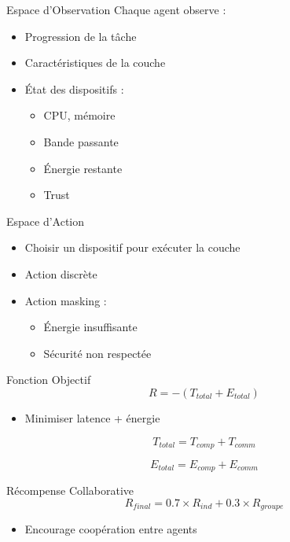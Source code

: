 \documentclass{beamer}
\begin{document}
\begin{frame}{Espace d’Observation}
Chaque agent observe :
\begin{itemize}
    \item Progression de la tâche
    \item Caractéristiques de la couche
    \item État des dispositifs :
    \begin{itemize}
        \item CPU, mémoire
        \item Bande passante
        \item Énergie restante
        \item Trust
    \end{itemize}
\end{itemize}
\end{frame}

\begin{frame}{Espace d’Action}
\begin{itemize}
    \item Choisir un dispositif pour exécuter la couche
    \item Action discrète
    \item Action masking :
    \begin{itemize}
        \item Énergie insuffisante
        \item Sécurité non respectée
    \end{itemize}
\end{itemize}
\end{frame}

\begin{frame}{Fonction Objectif}
\[
R = -(T_{total} + E_{total})
\]

\begin{itemize}
    \item Minimiser latence + énergie
\end{itemize}

\[
T_{total} = T_{comp} + T_{comm}
\]

\[
E_{total} = E_{comp} + E_{comm}
\]
\end{frame}

\begin{frame}{Récompense Collaborative}
\[
R_{final} = 0.7 \times R_{ind} + 0.3 \times R_{groupe}
\]

\begin{itemize}
    \item Encourage coopération entre agents
\end{itemize}
\end{frame}
\end{document}
